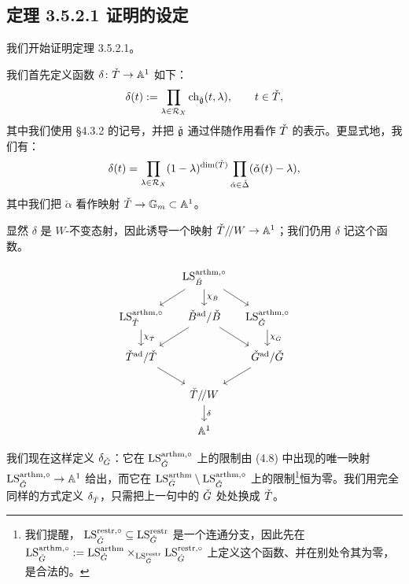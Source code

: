 \subsection{定理 3.5.2.1 证明的设定}

我们开始证明定理 3.5.2.1。


我们首先定义函数 $\delta\colon\check{T}\to\mathbb{A}^1$ 如下：
\[
  \delta(t) := \prod_{\lambda\in\mathcal{R}_X}\operatorname{ch}_{\check{\mathfrak g}}(t,\lambda),\qquad t\in\check{T},
\]
其中我们使用 §4.3.2 的记号，并把 $\check{\mathfrak g}$ 通过伴随作用看作 $\check{T}$ 的表示。更显式地，我们有：
\[
  \delta(t) = \prod_{\lambda\in\mathcal{R}_X}(1-\lambda)^{\dim(\check{T})}\prod_{\check\alpha\in\check\Delta}(\check\alpha(t)-\lambda),
\]
其中我们把 $\check\alpha$ 看作映射 $\check{T}\to\mathbb{G}_m\subset\mathbb{A}^1$。

显然 $\delta$ 是 $W$-不变态射，因此诱导一个映射 $\check{T}/\!/W\to\mathbb{A}^1$；我们仍用 $\delta$ 记这个函数。

\begin{equation}
\begin{tikzcd}[column sep=0.9em, row sep=1.5em]
& \LS^{\arthm,\circ}_{\bB} \arrow[dl] \arrow[d, "\chi_{\bB}"] \arrow[dr] & \\
\LS^{\arthm,\circ}_{\bT} \arrow[d, "\chi_{\bT}"]
  & \bB^{\ad}/\bB \arrow[dl] \arrow[dr]
  & \LS^{\arthm,\circ}_{\bG} \arrow[d, "\chi_{\bG}"] \\
\bT^{\ad}/\bT \arrow[dr] & & \bG^{\ad}/\bG \arrow[dl] \\
& \bT/\!/W \arrow[d, "\delta"] & \\
& \A^1 &
\end{tikzcd}
\end{equation}

我们现在这样定义 $\delta_{\check{G}}$：它在 $\mathrm{LS}^{\mathrm{arthm},\circ}_{\check{G}}$ 上的限制由 (4.8) 中出现的唯一映射 $\mathrm{LS}^{\mathrm{arthm},\circ}_{\check{G}}\to\mathbb{A}^1$ 给出，而它在 $\mathrm{LS}^{\mathrm{arthm}}_{\check{G}}\setminus\mathrm{LS}^{\mathrm{arthm},\circ}_{\check{G}}$ 上的限制\footnote{我们提醒，
$\mathrm{LS}^{\mathrm{restr},\circ}_{\check{G}}\subseteq\mathrm{LS}^{\mathrm{restr}}_{\check{G}}$ 是一个连通分支，因此先在
$\mathrm{LS}^{\mathrm{arthm},\circ}_{\check{G}}:=\mathrm{LS}^{\mathrm{arthm}}_{\check{G}}\times_{\mathrm{LS}^{\mathrm{restr}}_{\check{G}}}\mathrm{LS}^{\mathrm{restr},\circ}_{\check{G}}$
上定义这个函数、并在别处令其为零，是合法的。}恒为零。我们用完全同样的方式定义 $\delta_{\check{T}}$，只需把上一句中的 $\check{G}$ 处处换成 $\check{T}$。


